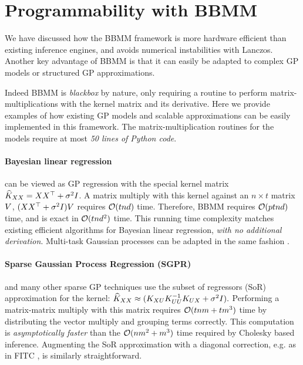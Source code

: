 \section{Programmability with BBMM}
\label{sec:programmability}
We have discussed how the BBMM framework is more hardware efficient than existing inference engines, and avoids numerical instabilities with Lanczos. Another key advantage of BBMM is that it can easily be adapted to complex GP models or structured GP approximations.

Indeed BBMM is \emph{blackbox} by nature, only requiring a routine to perform matrix-multiplications with the kernel matrix and its derivative.
Here we provide examples of how existing GP models and scalable approximations can be easily implemented in this framework.
The matrix-multiplication routines for the models require at most \emph{50 lines of Python code}.

\paragraph{Bayesian linear regression} can be viewed as GP regression with the special kernel matrix $\widehat{K}_{XX} = XX^{\top} + \sigma^{2}I$.
A matrix multiply with this kernel against an $n \times t$ matrix $V$, $(XX^{\top} + \sigma^{2}I)V$ requires $\bigo{tnd}$ time.
Therefore, BBMM requires $\bigo{ptnd}$ time, and is exact in $\bigo{tnd^2}$ time.
This running time complexity matches existing efficient algorithms for Bayesian linear regression, \emph{with no additional derivation}.
Multi-task Gaussian processes \cite{bonilla2008multi} can be adapted in the same fashion \cite{gardner2018product}.

\paragraph{Sparse Gaussian Process Regression (SGPR)} \cite{titsias2009variational} and many other sparse GP techniques \cite{quinonero2005unifying,snelson2006sparse,hensman2013gaussian} use the subset of regressors (SoR) approximation for the kernel:
$
  \widehat{K}_{XX} \approx (K_{XU}K_{UU}^{-1}K_{UX} + \sigma^{2}I).
$
Performing a matrix-matrix multiply with this matrix requires $\bigo{tnm + tm^{3}}$ time by distributing the vector multiply and grouping terms correctly.
This computation is \emph{asymptotically faster} than the $\bigo{nm^{2} + m^{3}}$ time required by Cholesky based inference. Augmenting the SoR approximation with a diagonal correction, e.g. as in FITC \cite{snelson2006sparse}, is similarly straightforward.

